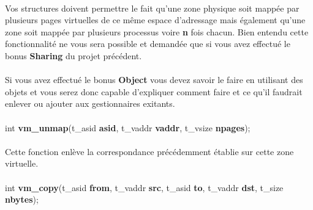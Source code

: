 \documentclass[10pt,a4wide]{article}
\begin{document}
\paragraph{}

Vos structures doivent permettre le fait qu'une zone physique soit mapp\'ee
par plusieurs pages virtuelles de ce m\^eme espace d'adressage mais \'egalement
qu'une zone soit mapp\'ee par plusieurs processus voire \textbf{n} fois
chacun. Bien entendu cette fonctionnalit\'e ne vous sera possible et demand\'ee
que si vous avez effectu\'e le bonus \textbf{Sharing} du projet pr\'ec\'edent.

\paragraph{}

Si vous avez effectu\'e le bonus \textbf{Object} vous devez savoir le faire
en utilisant des objets et vous serez donc capable d'expliquer comment
faire et ce qu'il faudrait enlever ou ajouter aux gestionnaires exitants.

\paragraph{}

\hspace{1.5cm}int \textbf{vm\_unmap}(t\_asid \textbf{asid},
                                     t\_vaddr \textbf{vaddr},
                                     t\_vsize \textbf{npages});

\paragraph{}

Cette fonction enl\`eve la correspondance pr\'ec\'edemment \'etablie
sur cette zone virtuelle.

\paragraph{}

\hspace{1.5cm}int \textbf{vm\_copy}(t\_asid \textbf{from},
                                    t\_vaddr \textbf{src},
                                    t\_asid \textbf{to},
                                    t\_vaddr \textbf{dst},
                                    t\_size \textbf{nbytes});

\paragraph{}
\end{document}
